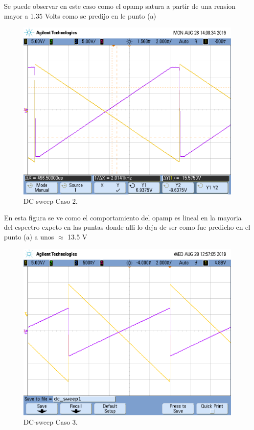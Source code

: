 Se puede observar en este caso como el opamp satura a partir de una rension mayor a 1.35 Volts como se predijo en le punto (a)
\begin{figure}[H]	
	\centering
	\includegraphics[width=\textwidth]{Ejercicio1/Imagenes/dc_sweep_c2.png}
	\caption{DC-sweep Caso 2.}
	\label{fig:dcc2}
\end{figure} 
En esta figura se ve como el comportamiento del opamp es lineal en la mayoria del espectro expeto en las puntas donde alli lo deja de ser como fue predicho en el punto (a) a unos $\approx$ 13.5 V
\begin{figure}[H]	
	\centering
	\includegraphics[width=\textwidth]{Ejercicio1/Imagenes/dc_sweep_c3.png}
	\caption{DC-sweep Caso 3.}
	\label{fig:dcc3}
\end{figure} 
